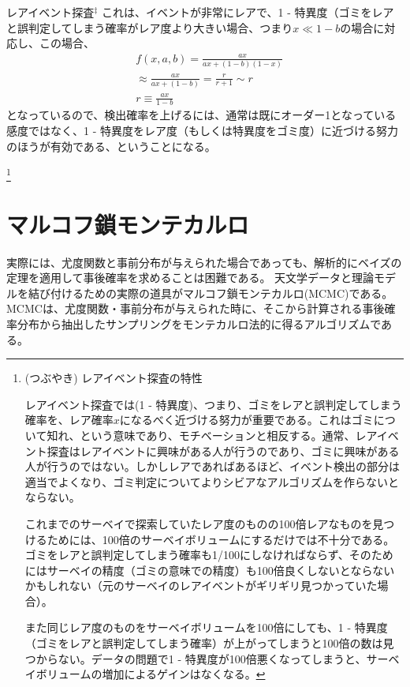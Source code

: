 \begin{itembox}{レアイベント探査$^\ddagger$}
これは、イベントが非常にレアで、1 - 特異度（ゴミをレアと誤判定してしまう確率がレア度より大きい場合、つまり$x \ll 1 - b$の場合に対応し、この場合、
\begin{align}
    &f(x,a,b) = \frac{a x }{a x + ( 1 - b ) (1 - x)} \nonumber \\
    &\approx \frac{a x }{a x + ( 1 - b )} = \frac{r}{ r + 1 } \sim r \\
    &r \equiv \frac{a x}{1 - b}
\end{align}
となっているので、検出確率を上げるには、通常は既にオーダー1となっている感度ではなく、1 - 特異度をレア度（もしくは特異度をゴミ度）に近づける努力のほうが有効である、ということになる。
\end{itembox}

\footnote{(つぶやき) レアイベント探査の特性

レアイベント探査では(1 - 特異度)、つまり、ゴミをレアと誤判定してしまう確率を、レア確率$x$になるべく近づける努力が重要である。これはゴミについて知れ、という意味であり、モチベーションと相反する。通常、レアイベント探査はレアイベントに興味がある人が行うのであり、ゴミに興味がある人が行うのではない。しかしレアであればあるほど、イベント検出の部分は適当でよくなり、ゴミ判定についてよりシビアなアルゴリズムを作らないとならない。

これまでのサーベイで探索していたレア度のものの100倍レアなものを見つけるためには、100倍のサーベイボリュームにするだけでは不十分である。ゴミをレアと誤判定してしまう確率も1/100にしなければならず、そのためにはサーベイの精度（ゴミの意味での精度）も100倍良くしないとならないかもしれない（元のサーベイのレアイベントがギリギリ見つかっていた場合）。

また同じレア度のものをサーベイボリュームを100倍にしても、1 - 特異度（ゴミをレアと誤判定してしまう確率）が上がってしまうと100倍の数は見つからない。データの問題で1 - 特異度が100倍悪くなってしまうと、サーベイボリュームの増加によるゲインはなくなる。%
}

\section{マルコフ鎖モンテカルロ}

実際には、尤度関数と事前分布が与えられた場合であっても、解析的にベイズの定理を適用して事後確率を求めることは困難である。
天文学データと理論モデルを結び付けるための実際の道具がマルコフ鎖モンテカルロ(MCMC)である。 MCMCは、尤度関数・事前分布が与えられた時に、そこから計算される事後確率分布から抽出したサンプリングをモンテカルロ法的に得るアルゴリズムである。

